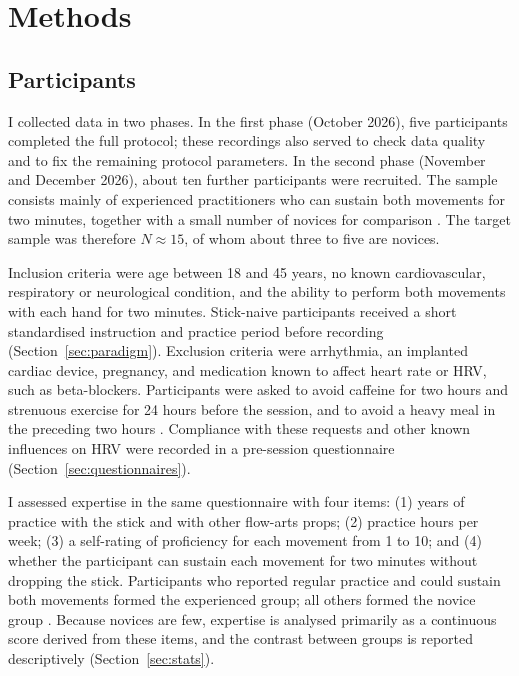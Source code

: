 \section{Methods}
\label{sec:methods}

\subsection{Participants}
\label{sec:participants}

I collected data in two phases. In the first phase (October 2026), five participants completed the full protocol; these recordings also served to check data quality and to fix the remaining protocol parameters. In the second phase (November and December 2026), about ten further participants were recruited. The sample consists mainly of experienced practitioners who can sustain both movements for two minutes, together with a small number of novices for comparison . The target sample was therefore $N \approx 15$, of whom about three to five are novices.

Inclusion criteria were age between 18 and 45 years, no known cardiovascular, respiratory or neurological condition, and the ability to perform both movements with each hand for two minutes. Stick-naive participants received a short standardised instruction and practice period before recording (Section~\ref{sec:paradigm}). Exclusion criteria were arrhythmia, an implanted cardiac device, pregnancy, and medication known to affect heart rate or HRV, such as beta-blockers. Participants were asked to avoid caffeine for two hours and strenuous exercise for 24 hours before the session, and to avoid a heavy meal in the preceding two hours \citep{laborde2017}. Compliance with these requests and other known influences on HRV were recorded in a pre-session questionnaire (Section~\ref{sec:questionnaires}).

I assessed expertise in the same questionnaire with four items: (1) years of practice with the stick and with other flow-arts props; (2) practice hours per week; (3) a self-rating of proficiency for each movement from 1 to 10; and (4) whether the participant can sustain each movement for two minutes without dropping the stick. Participants who reported regular practice and could sustain both movements formed the experienced group; all others formed the novice group . Because novices are few, expertise is analysed primarily as a continuous score derived from these items, and the contrast between groups is reported descriptively (Section~\ref{sec:stats}).

